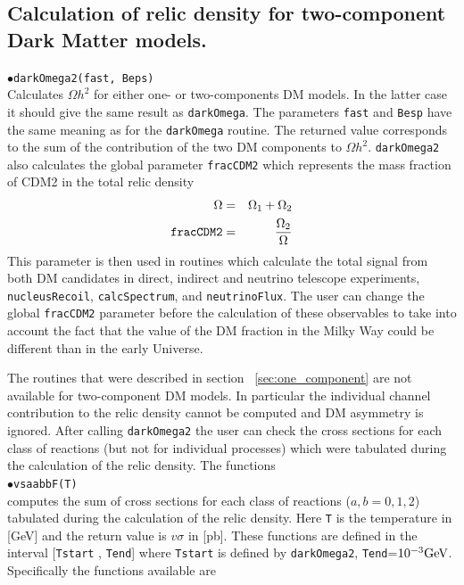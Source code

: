 \documentclass[12pt,a4paper]{article}
\begin{document}
\subsection{Calculation of relic density for  two-component Dark Matter models.}


$\bullet$\verb|darkOmega2(fast, Beps)|\\
Calculates $\Omega h^2$ for either  one- or  two-components DM models. In the latter case it should give the same result as \verb|darkOmega|.
The parameters {\tt fast} and {\tt Besp} have the same meaning as for the {\tt darkOmega} routine.
The returned value corresponds to the sum of the contribution of the two  DM components to  $\Omega h^2$.  
 \verb|darkOmega2| also calculates the  global parameter {\tt fracCDM2} which represents the mass fraction of CDM2 
in the total relic density
\begin{eqnarray}
  \Omega &=& \Omega_1+\Omega_2\\
  \verb|fracCDM2|&=&\frac{\Omega_2}{\Omega}
\end{eqnarray}
This parameter is then used in routines which calculate the total signal from both  DM candidates in direct, indirect and neutrino telescope experiments,
 \verb|nucleusRecoil|, \verb|calcSpectrum|,  and \verb|neutrinoFlux|.  The user can change the global {\tt  fracCDM2} parameter before the calculation of these observables
to take into account the fact that the value of the DM fraction in the Milky Way could be different than   in the early Universe.

The routines that were described in section ~\ref{sec:one_component} are not available for two-component DM models. In particular the individual channel contribution to the relic density cannot be computed and DM asymmetry is ignored. 
 After calling  {\tt  darkOmega2}  the user can check the  cross sections  
for each class of reactions (but not for individual processes) which were tabulated during the calculation of the relic density. 
The functions\\
$\bullet$\verb|vsaabbF(T)|\\
computes the sum of  cross sections  
for each class of reactions ($a,b=0,1,2$) tabulated during the calculation of the relic density. 
Here  \verb|T| is the temperature in [GeV] and the 
return value is $v\sigma$ in [pb].  These functions are defined in the interval [{\tt Tstart} , {\tt Tend}] where
{\tt Tstart} is defined by \verb|darkOmega2|, {\tt Tend}=$10^{-3}{\rm GeV}$. Specifically the functions available are
\end{document}
